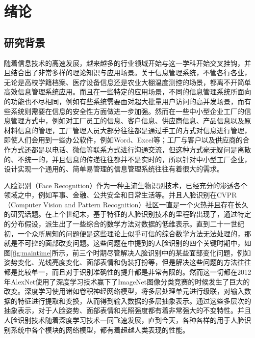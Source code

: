\section{绪论}
\setlength{\baselineskip}{20pt}
\fancyhf{}
\renewcommand{\headrulewidth}{0.5pt}

\subsection{研究背景}

随着信息技术的高速发展，越来越多的行业领域开始与这一学科开始交叉挂钩，并且结合出了非常多样的理论知识与应用场景。关于信息管理系统，不管各行各业，无论是高校学籍档案、医疗设备信息还是农业大棚温度测控的场景，都离不开简单高效信息管理系统应用。而且在一些特定的应用场景，不同的信息管理系统所面向的功能也不尽相同，例如有些系统需要面对超大批量用户访问的高并发场景，而有些系统则需要在信息的安全性方面做进一步加强。然而在一些中小型企业工厂的信息管理方式中，例如对工厂员工的信息、客户信息、供应商信息、产品信息以及原材料信息的管理，工厂管理人员大部分往往都是通过手工的方式对信息进行管理，即使人们会用到一些办公软件，例如Word、Excel等；工厂与客户以及供应商的合作方式还都是以电话、微信等联系方式进行沟通交流，但这种方式毫无疑问是离散的、不统一的，并且信息的传递往往都并不是实时的，所以针对中小型工厂企业，设计实现一个通用的、简单易管理的信息管理系统往往有着很大的需求。

人脸识别（Face Recognition）作为一种主流生物识别技术，已经充分的渗透各个领域之中，例如军事、金融、公共安全和日常生活等。并且人脸识别在CVPR（Computer Vision and Pattern Recognition）社区一直是一个火热并且存在长久的研究话题。在上个世纪末，基于特征的人脸识别技术的里程碑出现了，通过特定的分布假设，派生出了一些综合的数学方法对数据的低维表示。直到二十一世纪初，一个众所周知的问题便是这些理论上似乎可信的综合数学方法无法处理的，那就是不可控的面部改变问题。这些问题在\cite{deepfrsurvey}中提到的人脸识别的四个关键时期中，如图\ref{fig:maintime}所示，前三个时期尽管解决人脸识别中的某些面部变化问题，例如姿势变化、光线亮度变化、面部表情和伪装打扮等，但是解决这些问题的方法往往都是比较单一，而且对于识别准确性的提升都是非常有限的。然而这一切都在2012年AlexNet使用了深度学习技术赢下了ImageNet图像分类竞赛的时候发生了巨大的改变。深度学习使用诸如卷积神经网络模型，将多层处理单元进行级联，对输入数据的特征进行提取和变换，从而得到输入数据的多层抽象表示。通过这些多层次的抽象表示，对于人脸姿势、面部表情和光照强度都有着非常强大的不变特性。并且人脸识别技术随着深度学习技术一同飞速发展，直到今天，各种各样的用于人脸识别系统中各个模块的网络模型，都有着超越人类表现的性能。

